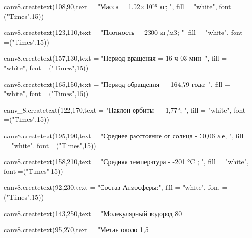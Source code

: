 \documentclass[14pt, oneside]{SavkinSeliverstov}
\begin{document}
	canv\underline{\hspace{0.2cm}}8.create\underline{\hspace{0.2cm}}text(108,90,text = "Масса = 1.02×10²⁶ кг; ", fill = "white", font =("Times",15))
	
	canv\underline{\hspace{0.2cm}}8.create\underline{\hspace{0.2cm}}text(123,110,text = "Плотность = 2300 кг/м3; ", fill = "white", font =("Times",15))
	
	canv\underline{\hspace{0.2cm}}8.create\underline{\hspace{0.2cm}}text(157,130,text = "Период вращения = 16 ч 03 мин; ", fill = "white", font =("Times",15))
	
	canv\underline{\hspace{0.2cm}}8.create\underline{\hspace{0.2cm}}text(165,150,text = "Период обращения — 164,79 года; ", fill = "white", font =("Times",15))
	
	canv_8.create\underline{\hspace{0.2cm}}text(122,170,text = "Наклон орбиты — 1,77°; ", fill = "white", font =("Times",15))
	
	canv\underline{\hspace{0.2cm}}8.create\underline{\hspace{0.2cm}}text(195,190,text = "Среднее расстояние от солнца - 30,06 а.е; ", fill = "white", font =("Times",15))

	canv\underline{\hspace{0.2cm}}8.create\underline{\hspace{0.2cm}}text(158,210,text = "Средняя температура -  -201  °C ; ", fill = "white", font =("Times",15))
	
	canv\underline{\hspace{0.2cm}}8.create\underline{\hspace{0.2cm}}text(92,230,text = "Состав Атмосферы:", fill = "white", font =("Times",15))
	
	canv\underline{\hspace{0.2cm}}8.create\underline{\hspace{0.2cm}}text(143,250,text = "Молекулярный водород 80%
	
	canv\underline{\hspace{0.2cm}}8.create\underline{\hspace{0.2cm}}text(95,270,text = "Метан около 1,5%
	
\end{document}
